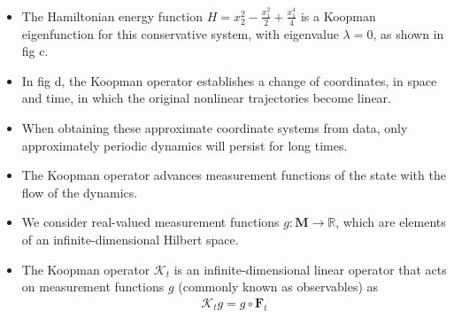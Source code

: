 \documentclass[hyperref={pdfpagemode=FullScreen},aspectratio=169]{beamer}
\begin{document}
\begin{frame}{}
\begin{itemize}
\setlength\itemsep{1em}
\item The Hamiltonian energy function $H = x_2^2 - \frac{x_1^2}{2} + \frac{x_1^4}{4}$ is a Koopman eigenfunction for this conservative system, with eigenvalue $\lambda = 0$, as shown in fig c.
\item In fig d, the Koopman operator establishes a change of coordinates, in space and time, in which the original nonlinear trajectories become linear. 
\item When obtaining these approximate coordinate systems from data, only approximately periodic dynamics will persist for long times. 
\item The Koopman operator advances measurement functions of the state with the flow of the
dynamics. 
\item We consider real-valued measurement functions $g \colon \mathbf{M} \to \mathbb{R}$, which are elements of an infinite-dimensional Hilbert space.
\item The Koopman operator $\mathcal{K}_t$ is an infinite-dimensional linear operator that acts on measurement functions $g$ (commonly known as observables) as
\begin{align}
\mathcal{K}_t g = g \circ \mathbf{F}_t
\end{align}
\end{itemize}
\end{frame}
\end{document}
